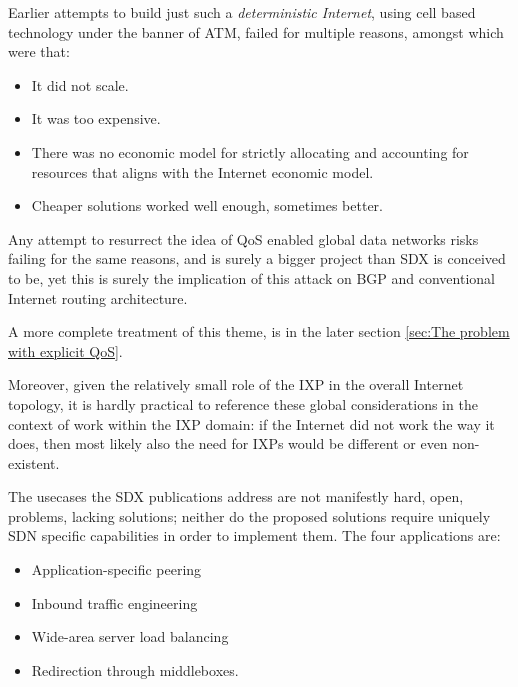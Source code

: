 Earlier attempts to build just such a \emph{deterministic Internet}, using cell based technology under the banner of ATM, failed for multiple reasons, amongst which were that:
\begin{itemize}[noitemsep,nolistsep]
	\item{It did not scale.}
	\item{It was too expensive.}
	\item{There was no economic model for strictly allocating and accounting for resources that aligns with the Internet economic model.}
	\item{Cheaper solutions worked well enough, sometimes better.}
\end{itemize}

Any attempt to resurrect the idea of QoS enabled global data networks risks failing for the same reasons, and is surely a bigger project than SDX is conceived to be, yet this is surely the implication of this attack on BGP and conventional Internet routing architecture.

A more complete treatment of this theme, is in the later section
\ref{sec:The problem with explicit QoS}.



Moreover, given the relatively small role of the IXP in the overall Internet topology, it is hardly practical to reference these global considerations in the context of work within the IXP domain: if the Internet did not work the way it does, then most likely also the need for IXPs would be different or even non-existent.


The usecases the SDX publications address are not manifestly hard, open, problems, lacking solutions; neither do the proposed solutions require uniquely SDN specific capabilities in order to implement them.
The four applications are:

\begin{itemize}[noitemsep,nolistsep]
	\item{Application-specific peering}
	\item{Inbound traffic engineering}
	\item{Wide-area server load balancing}
	\item{Redirection through middleboxes.}
\end{itemize}

